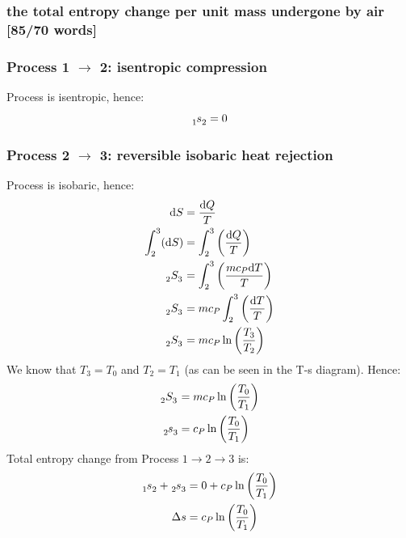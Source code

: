 \documentclass[12pt]{article}
\numberwithin{equation}{section}
\begin{document}
\begin{flushleft}
\subsubsection[Entropy change.]{the total entropy change per unit mass undergone by air [85/70 words]}
\subsubsection*{Process 1 $\rightarrow$ 2: isentropic compression}
Process is isentropic, hence:
\begin{equation}
  \tensor[_1]{s}{_2} = 0
\end{equation}
\subsubsection*{Process 2 $\rightarrow$ 3: reversible isobaric heat rejection}
Process is isobaric, hence:
\begin{align}
  \mathrm{d}S &= \frac{\mathrm{d}Q}{T}\\
  \int_2^3 (\mathrm{d}S) &= \int_2^3 \left(\frac{\mathrm{d}Q}{T} \right)\\
  \tensor[_2]{S}{_3} &= \int_2^3 \left(\frac{mc_P\mathrm{d}T}{T}\right)\\
  \tensor[_2]{S}{_3} &= mc_P\int_2^3 \left(\frac{\mathrm{d}T}{T}\right)\\
  \tensor[_2]{S}{_3} &= mc_P \ln \left( \frac{T_3}{T_2} \right)
\end{align}
We know that $T_3 = T_0$ and $T_2 = T_1$ (as can be seen in the T-s diagram). Hence:
\begin{align}
  \tensor[_2]{S}{_3} &= mc_P \ln \left( \frac{T_0}{T_1} \right)\\
  \tensor[_2]{s}{_3} &= c_P \ln \left( \frac{T_0}{T_1} \right)
\end{align}
Total entropy change from Process $1 \rightarrow 2 \rightarrow 3$ is:
\begin{align}
  \tensor[_1]{s}{_2} + \tensor[_2]{s}{_3} &= 0 + c_P \ln \left( \frac{T_0}{T_1} \right)\\
  \Delta s &= c_P \ln \left( \frac{T_0}{T_1} \right)
\end{align}

\end{flushleft}
\end{document}
